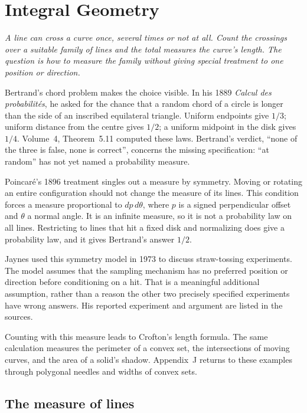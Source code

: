 \chapter{Integral Geometry}

\begin{center}\itshape
A line can cross a curve once, several times or not at all. Count the crossings over a suitable family of lines and the total measures the curve's length. The question is how to measure the family without giving special treatment to one position or direction.
\end{center}

Bertrand's chord problem makes the choice visible. In his 1889 \emph{Calcul des probabilités}, he asked for the chance that a random chord of a circle is longer than the side of an inscribed equilateral triangle. Uniform endpoints give $1/3$; uniform distance from the centre gives $1/2$; a uniform midpoint in the disk gives $1/4$. Volume~4, Theorem~5.11 computed these laws. Bertrand's verdict, ``none of the three is false, none is correct'', concerns the missing specification: ``at random'' has not yet named a probability measure.

Poincaré's 1896 treatment singles out a measure by symmetry. Moving or rotating an entire configuration should not change the measure of its lines. This condition forces a measure proportional to $dp\,d\theta$, where $p$ is a signed perpendicular offset and $\theta$ a normal angle. It is an infinite measure, so it is not a probability law on all lines. Restricting to lines that hit a fixed disk and normalizing does give a probability law, and it gives Bertrand's answer $1/2$.

Jaynes used this symmetry model in 1973 to discuss straw-tossing experiments. The model assumes that the sampling mechanism has no preferred position or direction before conditioning on a hit. That is a meaningful additional assumption, rather than a reason the other two precisely specified experiments have wrong answers. His reported experiment and argument are listed in the sources.

Counting with this measure leads to Crofton's length formula. The same calculation measures the perimeter of a convex set, the intersections of moving curves, and the area of a solid's shadow. Appendix~J returns to these examples through polygonal needles and widths of convex sets.

\section{The measure of lines}

